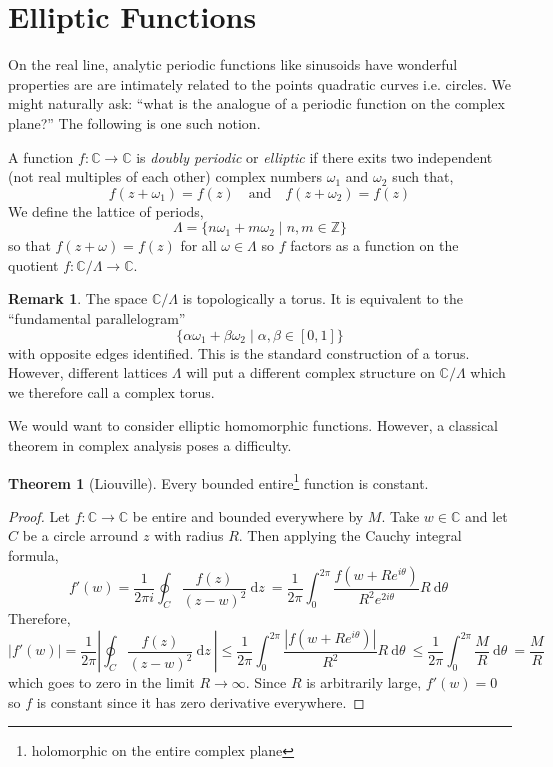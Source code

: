 \documentclass{article}
\newcommand{\Z}{\mathbb{Z}}
\newcommand{\C}{\mathbb{C}}
\renewcommand{\d}[1]{\: \mathrm{d}#1 \:}
\theoremstyle{definition}
\newtheorem{theorem}{Theorem}[section]
\newtheorem{remark}{Remark}[section]
\newenvironment{definition}[1][Definition:]{\begin{trivlist}
\item[\hskip \labelsep {\bfseries #1}]}{\end{trivlist}}
\begin{document}
\section{Elliptic Functions}

On the real line, analytic periodic functions like sinusoids have wonderful properties are are intimately related to the points quadratic curves i.e. circles. We might naturally ask: ``what is the analogue of a periodic function on the complex plane?'' The following is one such notion.

\begin{definition}
A function $f : \C \to \C$ is \textit{doubly periodic} or \textit{elliptic} if there exits two independent (not real multiples of each other) complex numbers $\omega_1$ and $\omega_2$ such that,
\[ f(z + \omega_1) = f(z) \quad \text{and} \quad f(z + \omega_2) = f(z) \]
We define the lattice of periods,
\[ \Lambda = \{ n \omega_1 + m \omega_2 \mid n,m \in \Z \} \]
so that $f(z + \omega) = f(z)$ for all $\omega \in \Lambda$ so $f$ factors as a function on the quotient $f : \C / \Lambda \to \C$. 
\end{definition}

\begin{remark}
The space $\C / \Lambda$ is topologically a torus. It is equivalent to the ``fundamental parallelogram''
\[ \{ \alpha \omega_1 + \beta \omega_2 \mid \alpha, \beta \in [0, 1] \} \]
with opposite edges identified. This is the standard construction of a torus. However, different lattices $\Lambda$ will put a different complex structure on $\C / \Lambda$ which we therefore call a complex torus. 
\end{remark}
\noindent
We would want to consider elliptic homomorphic functions. However, a classical theorem in complex analysis poses a difficulty.

\begin{theorem}[Liouville]
Every bounded entire\footnote{holomorphic on the entire complex plane} function is constant.
\end{theorem}

\begin{proof}
Let $f : \C \to \C$ be entire and bounded everywhere by $M$. Take $w \in \C$ and let $C$ be a circle arround $z$ with radius $R$. Then applying the Cauchy integral formula,
\[ f'(w) = \frac{1}{2 \pi i} \oint_C \frac{f(z)}{(z - w)^2} \d{z} = \frac{1}{2 \pi} \int_0^{2 \pi} \frac{f(w + R e^{i \theta})}{R^2 e^{2 i \theta}} R \d{\theta} \]
Therefore,
\[ |f'(w)| = \frac{1}{2 \pi} \left| \oint_C \frac{f(z)}{(z - w)^2} \d{z} \right| \le \frac{1}{2 \pi} \int_0^{2 \pi} \frac{|f(w + R e^{i \theta})|}{R^2} R \d{\theta} \le \frac{1}{2 \pi} \int_0^{2 \pi} \frac{M}{R} \d{\theta} = \frac{M}{R} \]
which goes to zero in the limit $R \to \infty$. Since $R$ is arbitrarily large, $f'(w) = 0$ so $f$ is constant since it has zero derivative everywhere. 
\end{proof}
\end{document}
